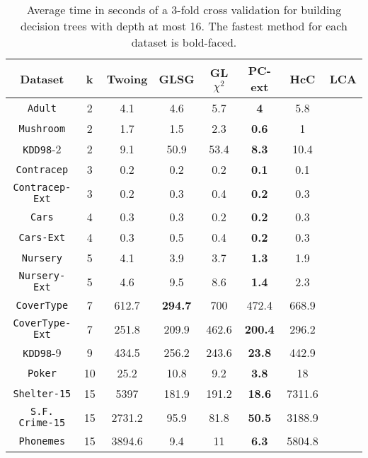 \begin{table}[]
\scriptsize
\centering
\begin{tabular}{c|c|c|c|c|c|c|c}
Dataset             & k  & Twoing        & GLSG      & GL$\chi^2$  & PC-ext    & HcC    & LCA    \\
\hline
{\tt Adult}         & 2  & 4.1           & 4.6       & 5.7         &{\bf 4}    & 5.8    &        \\
{\tt Mushroom}      & 2  & 1.7           & 1.5       & 2.3         &{\bf 0.6}  & 1      &        \\
{\tt KDD98}-2       & 2  & 9.1           & 50.9      & 53.4        &{\bf 8.3}  & 10.4   &        \\
{\tt Contracep}     & 3  & 0.2           & 0.2       & 0.2         &{\bf 0.1}  & 0.1    &        \\
{\tt Contracep-Ext} & 3  & 0.2           & 0.3       & 0.4         &{\bf 0.2}  & 0.3    &        \\
{\tt Cars}          & 4  & 0.3           & 0.3       & 0.2         &{\bf 0.2}  & 0.3    &        \\
{\tt Cars-Ext}      & 4  & 0.3           & 0.5       & 0.4         &{\bf 0.2}  & 0.3    &        \\
{\tt Nursery}       & 5  & 4.1           & 3.9       & 3.7         &{\bf 1.3}  & 1.9    &        \\
{\tt Nursery-Ext}   & 5  & 4.6           & 9.5       & 8.6         &{\bf 1.4}  & 2.3    &        \\
{\tt CoverType}     & 7  & 612.7         &{\bf 294.7}& 700         & 472.4     & 668.9  &        \\
{\tt CoverType-Ext} & 7  & 251.8         & 209.9     & 462.6       &{\bf 200.4}& 296.2  &        \\
{\tt KDD98}-9       & 9  & 434.5         & 256.2     & 243.6       &{\bf 23.8} & 442.9  &        \\
{\tt Poker}         & 10 & 25.2          & 10.8      & 9.2         &{\bf 3.8}  & 18     &        \\
{\tt Shelter-15}    & 15 & 5397          & 181.9     & 191.2       &{\bf 18.6} & 7311.6 &        \\
{\tt S.F. Crime-15} & 15 & 2731.2        & 95.9      & 81.8        &{\bf 50.5} & 3188.9 &        \\
{\tt Phonemes}      & 15 & 3894.6        & 9.4       & 11          &{\bf 6.3}  & 5804.8
\end{tabular}
\caption{Average time in seconds of a 3-fold cross validation
for building decision trees with depth at most 16.
The fastest method for each dataset is bold-faced.}
\label{tab:time-16}
\end{table}


